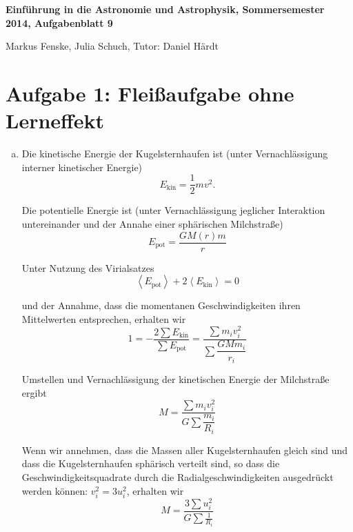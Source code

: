 \documentclass[a4paper,german,12pt,smallheadings]{scrartcl}
\begin{document}
\allowdisplaybreaks %
\begin{center}
\bfseries %
\sffamily %
\vspace{-40pt}
Einführung in die Astronomie und Astrophysik, Sommersemester 2014, Aufgabenblatt 9

Markus Fenske, Julia Schuch, Tutor: Daniel Härdt
\vspace{-10pt}
\end{center}
\section*{Aufgabe 1: Fleißaufgabe ohne Lerneffekt}
\begin{enumerate}[a)]
  \item
    Die kinetische Energie der Kugelsternhaufen ist (unter Vernachlässigung interner kinetischer Energie)
    \begin{equation}
      E_\text{kin} = \frac{1}{2} m v^2.
    \end{equation}

    Die potentielle Energie ist (unter Vernachlässigung jeglicher Interaktion
    untereinander und der Annahe einer sphärischen Milchstraße)
    \begin{equation}
      E_\text{pot} = \frac{GM(r)m}{r}
    \end{equation}

    Unter Nutzung des Virialsatzes
    \begin{equation}
      \left<E_\text{pot}\right> + 2 \left<E_\text{kin}\right> = 0
    \end{equation}

    und der Annahme, dass die momentanen Geschwindigkeiten ihren Mittelwerten
    entsprechen, erhalten wir
    \begin{equation}
      1 = -\frac{2\sum E_\text{kin}}{\sum E_\text{pot}} = \frac{\sum m_i v_i^2}{\sum \dfrac{GM m_i}{r_i}}
    \end{equation}

    Umstellen und Vernachlässigung der kinetischen Energie der Milchstraße
    ergibt
    \begin{equation}
      M = \frac{\sum m_i v_i^2}{G \sum \dfrac{m_i}{R_i}}
    \end{equation}

    Wenn wir annehmen, dass die Massen aller Kugelsternhaufen gleich sind und
    dass die Kugelsternhaufen sphärisch verteilt sind, so dass die
    Geschwindigkeitsquadrate durch die Radialgeschwindigkeiten ausgedrückt
    werden können: $v_i^2 = 3 u_i^2$, erhalten wir
    \begin{equation}
      M = \frac{3 \sum u_i^2}{G \sum \frac{1}{R_i}}
    \end{equation}
\end{enumerate}
\end{document}
